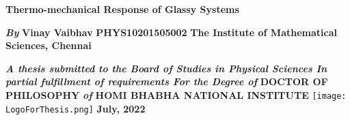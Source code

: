 \thispagestyle{plain}
\begin{titlepage}
    \addtocounter{page}{-1}
    \begin{center}

        \textbf{\huge Thermo-mechanical Response of \vskip 0.10cm \huge Glassy Systems}
        
        \vskip 0.70cm
        {\bf {\em \small By}} 
        \vskip 0.2cm
        {\bf {\Large Vinay Vaibhav}}
        \vskip 0.0cm
        {\bf {\Large PHYS10201505002}}
        \vskip 0.5cm
        {\bf {\large The Institute of Mathematical Sciences, Chennai}}
        \vskip 2.6cm
        
        {\bf {\em {\large A thesis submitted to the
        \vskip 0.05cm
        Board of Studies in Physical Sciences
        \vskip 0.05cm
        In partial fulfillment of requirements
        \vskip 0.05cm
        For the Degree of}}}
        \vskip 0.2cm
        {\bf {\large DOCTOR OF PHILOSOPHY}}
        \vskip 0.2cm
        {\bf {\em of}}
        \vskip 0.2cm
        {\bf {\large HOMI BHABHA NATIONAL INSTITUTE}}
        \vfill
        \texttt{[image: LogoForThesis.png]}
        \vfill
        {\bf {\large July, 2022}}
        \vfill
    \end{center}
\end{titlepage}
